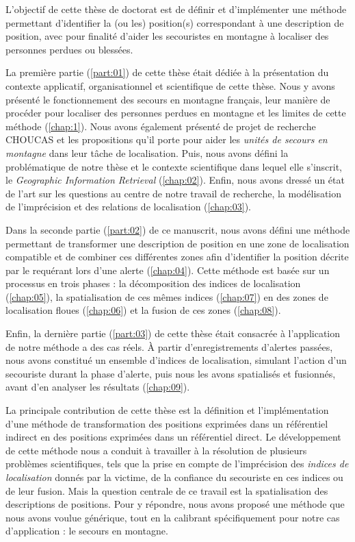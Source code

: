 L'objectif de cette thèse de doctorat est de définir et d'implémenter
une méthode permettant d'identifier la (ou les) position(s)
correspondant à une description de position, avec pour finalité
d'aider les secouristes en montagne à localiser des personnes perdues
ou blessées.

La première partie (\ref{part:01}) de cette thèse était dédiée à la
présentation du contexte applicatif, organisationnel et scientifique
de cette thèse. Nous y avons présenté le fonctionnement des secours en
montagne français, leur manière de procéder pour localiser des
personnes perdues en montagne et les limites de cette méthode
(\autoref{chap:1}). Nous avons également présenté de projet de
recherche CHOUCAS et les propositions qu'il porte pour aider les
\emph{unités de secours en montagne} dans leur tâche de
localisation. Puis, nous avons défini la problématique de notre thèse
et le contexte scientifique dans lequel elle s'inscrit, le
\emph{Geographic Information Retrieval} (\autoref{chap:02}). Enfin,
nous avons dressé un état de l'art sur les questions au centre de
notre travail de recherche, la modélisation de l'imprécision et des
relations de localisation (\autoref{chap:03}).

Dans la seconde partie (\ref{part:02}) de ce manuscrit, nous avons
défini une méthode permettant de transformer une description de
position en une zone de localisation compatible et de combiner ces
différentes zones afin d’identifier la position décrite par le
requérant lors d'une alerte (\autoref{chap:04}). Cette méthode est
basée sur un processus en trois phases : la décomposition des indices
de localisation (\autoref{chap:05}), la spatialisation de ces mêmes
indices (\autoref{chap:07}) en des zones de localisation floues
(\autoref{chap:06}) et la fusion de ces zones (\autoref{chap:08}).

Enfin, la dernière partie (\ref{part:03}) de cette thèse était
consacrée à l’application de notre méthode a des cas réels. À partir
d'enregistrements d'alertes passées, nous avons constitué un ensemble
d'indices de localisation, simulant l'action d'un secouriste durant la
phase d'alerte, puis nous les avons spatialisés et fusionnés, avant
d'en analyser les résultats (\autoref{chap:09}).


La principale contribution de cette thèse est la définition et
l'implémentation d'une méthode de transformation des positions
exprimées dans un référentiel indirect en des positions exprimées dans
un référentiel direct. Le développement de cette méthode nous a
conduit à travailler à la résolution de plusieurs problèmes
scientifiques, tels que la prise en compte de l'imprécision des
\emph{indices de localisation} donnés par la victime, de la confiance
du secouriste en ces indices ou de leur fusion. Mais la question
centrale de ce travail est la spatialisation des descriptions de
positions. Pour y répondre, nous avons proposé une méthode que nous
avons voulue générique, tout en la calibrant spécifiquement pour notre
cas d’application : le secours en montagne.

